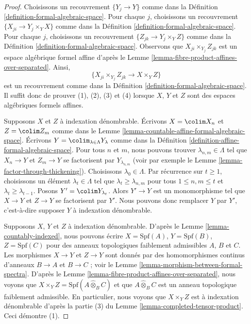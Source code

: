 \begin{proof}
Choisissons un recouvrement $\{Y_j \to Y\}$ comme dans la
Définition \ref{definition-formal-algebraic-space}.
Pour chaque $j$, choisissons un recouvrement $\{X_{ji} \to Y_j \times_Y X\}$
comme dans la Définition \ref{definition-formal-algebraic-space}.
Pour chaque $j$, choisissons un recouvrement $\{Z_{jk} \to Y_j \times_Y Z\}$
comme dans la Définition \ref{definition-formal-algebraic-space}.
Observons que $X_{ji} \times_{Y_j} Z_{jk}$ est un
espace algébrique formel affine d'après le
Lemme \ref{lemma-fibre-product-affines-over-separated}.
Ainsi,
$$
\{X_{ji} \times_{Y_j} Z_{jk} \to X \times_Y Z\}
$$
est un recouvrement comme dans la Définition \ref{definition-formal-algebraic-space}.
Il suffit donc de prouver (1), (2), (3) et (4) lorsque $X$, $Y$ et $Z$
sont des espaces algébriques formels affines.

\medskip\noindent
Supposons $X$ et $Z$ à indexation dénombrable. Écrivons $X = \colim X_n$ et
$Z = \colim Z_m$ comme dans le
Lemme \ref{lemma-countable-affine-formal-algebraic-space}.
Écrivons $Y = \colim_{\lambda \in \Lambda} Y_\lambda$ comme dans la
Définition \ref{definition-affine-formal-algebraic-space}.
Pour tous $n$ et $m$, nous pouvons trouver $\lambda_{n, m} \in \Lambda$
tel que $X_n \to Y$ et $Z_m \to Y$ se factorisent par $Y_{\lambda_{n, m}}$
(voir par exemple le Lemme \ref{lemma-factor-through-thickening}).
Choisissons $\lambda_0 \in \Lambda$. Par récurrence sur $t \geq 1$,
choisissons un élément $\lambda_t \in \Lambda$ tel que
$\lambda_t \geq \lambda_{n, m}$ pour tous $1 \leq n, m \leq t$
et $\lambda_t \geq \lambda_{t - 1}$. Posons $Y' = \colim Y_{\lambda_t}$.
Alors $Y' \to Y$ est un monomorphisme tel que $X \to Y$ et $Z \to Y$
se factorisent par $Y'$. Nous pouvons donc remplacer $Y$ par $Y'$, c'est-à-dire
supposer $Y$ à indexation dénombrable.

\medskip\noindent
Supposons $X$, $Y$ et $Z$ à indexation dénombrable. D'après le
Lemme \ref{lemma-countably-indexed}, nous pouvons écrire
$X = \text{Spf}(A)$, $Y = \text{Spf}(B)$, $Z = \text{Spf}(C)$
pour des anneaux topologiques faiblement admissibles $A$, $B$ et $C$.
Les morphismes $X \to Y$ et $Z \to Y$ sont donnés par des
homomorphismes continus d'anneaux $B \to A$ et $B \to C$ ; voir le
Lemme \ref{lemma-morphism-between-formal-spectra}.
D'après le Lemme \ref{lemma-fibre-product-affines-over-separated},
nous voyons que $X \times_Y Z = \text{Spf}(A \widehat{\otimes}_B C)$
et que $A \widehat{\otimes}_B C$ est un anneau topologique faiblement admissible.
En particulier, nous voyons que $X \times_Y Z$ est à indexation dénombrable
d'après la partie (3) du Lemme \ref{lemma-completed-tensor-product}.
Ceci démontre (1).


\end{proof}
